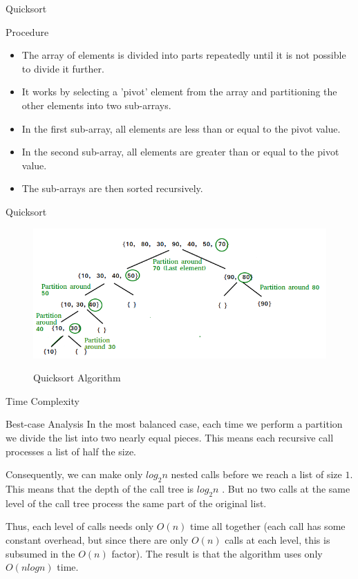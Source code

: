 \documentclass{beamer}
\begin{document}
  \begin{frame}{Quicksort}
 	   
 	    \begin{block}{Procedure}
 	    \begin{itemize}
 		\item<2->The array of elements is divided into parts repeatedly until it is not possible to divide it further.
 		\item<3-> It works by selecting a 'pivot' element from the array and partitioning the other elements into two sub-arrays.
 		\item<4-> In the first sub-array, all elements are less than or equal to the pivot value.
 		\item<5->  In the second sub-array, all elements are greater than or equal to the pivot value.
 		\item<6-> The sub-arrays are then sorted recursively. 
 			\end{itemize}
 		\end{block}

  \end{frame}
 
 \begin{frame}{Quicksort}
 \begin{figure}[h]
 	\centering
 	\includegraphics[scale=0.5]{QuickSort2.png}
 	\label{fig:1}
 	\caption{Quicksort Algorithm}
 \end{figure}
 \end{frame}

\begin{frame}{Time Complexity}
	
	\begin{block}{Best-case Analysis}
		In the most balanced case, each time we perform a partition we divide the list into two nearly equal pieces. This means each recursive call processes a list of half the size.\pause 
		
		Consequently, we can make only $log_2 n$ nested calls before we reach a list of size $1$. This means that the depth of the call tree is  $log_2 n$ . But no two calls at the same level of the call tree process the same part of the original list. \pause
		
		Thus, each level of calls needs only $O(n)$ time all together (each call has some constant overhead, but since there are only $O(n)$ calls at each level, this is subsumed in the $O(n)$ factor). The result is that the algorithm uses only \alert{$O(n log n)$} time.	
	\end{block}
	
\end{frame}
\end{document}
